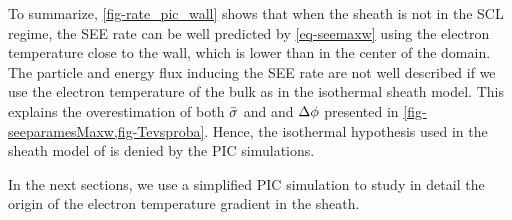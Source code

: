    To summarize, \cref{fig-rate_pic_wall} shows that when the sheath  is not in the \ac{SCL} regime, the \ac{SEE} rate can be well predicted by \cref{eq-seemaxw} using the electron temperature close to the wall, which is lower than in the center of the domain.
   The particle and energy flux inducing the \ac{SEE} rate are not well described if we use the electron temperature of the bulk as in the isothermal sheath model.
   This explains the overestimation of both $ \bar{\sigma }$ and and $\Delta \phi$ presented in \cref{fig-seeparamesMaxw,fig-Tevsproba}.
   Hence, the isothermal hypothesis used in the sheath model of  is denied by the PIC simulations.
   
   In the next sections, we use a simplified \ac{PIC} simulation to study in detail the origin of the electron temperature gradient in the sheath.
   

